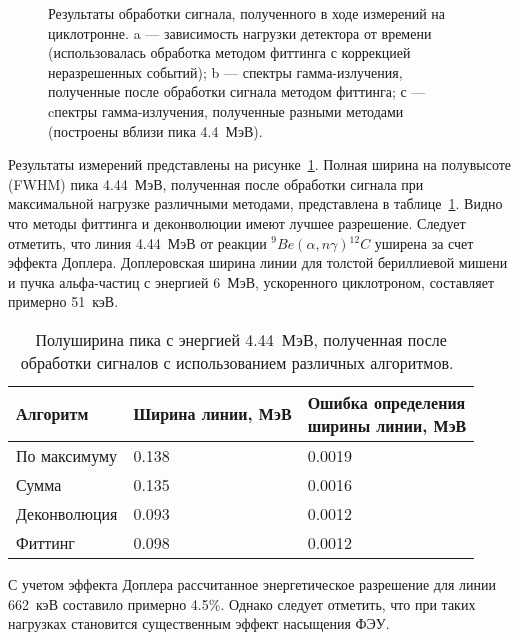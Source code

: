 \begin{figure}[ht!]
  \caption{ Результаты обработки сигнала, полученного в ходе измерений на циклотронне. a --- зависимость нагрузки детектора от времени (использовалась обработка методом фиттинга с коррекцией неразрешенных событий); b --- спектры гамма-излучения, полученные после обработки сигнала методом фиттинга; с --- cпектры гамма-излучения, полученные разными методами (построены вблизи пика 4.4~МэВ).~\cite{Khilkevitch2020} }
  \label{fig:processingCycloSignal}
\end{figure}

Результаты измерений представлены на рисунке~\ref{fig:processingCycloSignal}. Полная ширина на полувысоте (FWHM) пика 4.44~МэВ, полученная после обработки сигнала при максимальной нагрузке различными методами, представлена в таблице~\ref{tab:processingCycloSignal}. Видно что методы фиттинга и деконволюции имеют лучшее разрешение. Следует отметить, что линия 4.44~МэВ от реакции ${}^9Be(\alpha,n\gamma){}^{12}C$ уширена за счет эффекта Доплера. Доплеровская ширина линии для толстой бериллиевой мишени и пучка альфа-частиц с энергией 6~МэВ, ускоренного циклотроном, составляет примерно 51~кэВ.~\cite{Khilkevitch2020}

\begin{table} [htbp]
    \centering
    \begin{threeparttable}
      \caption{ Полуширина пика с энергией 4.44~МэВ, полученная после обработки сигналов с использованием различных алгоритмов.~\cite{Khilkevitch2020} }
        \label{tab:processingCycloSignal}
        \begin{tabular}{| p{4cm} | p{6cm} | p{6cm} | }
            \hline
            Алгоритм   & Ширина линии, МэВ & \makecell{ Ошибка определения \\ ширины линии, МэВ } \\
            \hline
            По максимуму & 0.138 & 0.0019 \\
            Сумма &	0.135 &	0.0016\\
          Деконволюция &	0.093 &	0.0012 \\
          Фиттинг &	0.098 &	0.0012 \\
            \hline
        \end{tabular}
    \end{threeparttable}
\end{table}

С учетом эффекта Доплера рассчитанное энергетическое разрешение для линии 662~кэВ составило примерно 4.5\%. Однако следует отметить, что при таких нагрузках становится существенным эффект насыщения ФЭУ.

